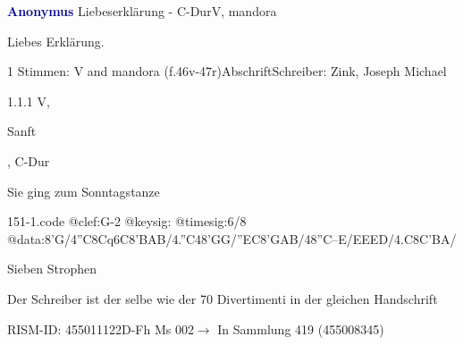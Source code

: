 \documentclass[twocolumn, 12pt]{book}
\begin{document}
\par \vspace{16pt} \textcolor{darkblue}{\textbf{Anonymus  }}\hfillplus{\textbf{[151]}}\newline Liebeserklärung - C-Dur\newline V, mandora
\par \begin{itshape}[heading, f.46v:] Liebes Erklärung.\end{itshape} 
\par \textcolor{darkblue}{}  1 Stimmen: V and mandora  (f.46v-47r)\newline Abschrift\newline Schreiber: Zink, Joseph Michael
\par 1.1.1  V, \begin{itshape}Sanft\end{itshape}, C-Dur\newline \begin{footnotesize} Sie ging zum Sonntagstanze \end{footnotesize}  
\begin{filecontents*}{151-1.code}
@clef:G-2
@keysig:
@timesig:6/8
@data:8'G/4''C8Cq6C{8'BA}B/4.''C48'GG/''EC{8'GA}B/48''C--E/EEED/4.C{8C'B}A/
\end{filecontents*}
\newline %
\par Sieben Strophen
\par Der Schreiber ist der selbe wie der 70 Divertimenti in der gleichen Handschrift
\par RISM-ID: 455011122\newline D-Fh  Ms 002\newline $\rightarrow$ In Sammlung 419 (455008345)
      
\end{document}

